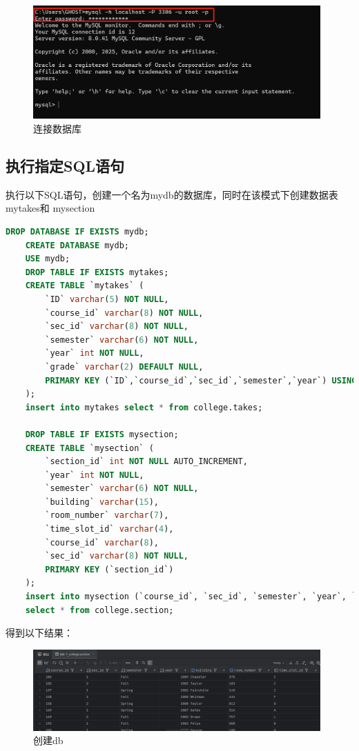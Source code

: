 \documentclass{article}
\begin{document}
	\begin{figure}[H]
		\centering
		\includegraphics[width=11cm]{./images/1.连接数据库.png}
		\caption{连接数据库}
	\end{figure}
	
	\subsection{执行指定SQL语句}
	
	执行以下SQL语句，创建一个名为mydb的数据库，同时在该模式下创建数据表mytakes和
	mysection
	
	\begin{lstlisting}[language=sql, title=创建db数据库, tabsize=4]
	DROP DATABASE IF EXISTS mydb;
	CREATE DATABASE mydb;
	USE mydb;
	DROP TABLE IF EXISTS mytakes;
	CREATE TABLE `mytakes` (
		`ID` varchar(5) NOT NULL,
		`course_id` varchar(8) NOT NULL,
		`sec_id` varchar(8) NOT NULL,
		`semester` varchar(6) NOT NULL,
		`year` int NOT NULL,
		`grade` varchar(2) DEFAULT NULL,
		PRIMARY KEY (`ID`,`course_id`,`sec_id`,`semester`,`year`) USING BTREE
	);
	insert into mytakes select * from college.takes;
	
	DROP TABLE IF EXISTS mysection;
	CREATE TABLE `mysection` (
		`section_id` int NOT NULL AUTO_INCREMENT,
		`year` int NOT NULL,
		`semester` varchar(6) NOT NULL,
		`building` varchar(15),
		`room_number` varchar(7),
		`time_slot_id` varchar(4),
		`course_id` varchar(8),
		`sec_id` varchar(8) NOT NULL,
		PRIMARY KEY (`section_id`)
	);
	insert into mysection (`course_id`, `sec_id`, `semester`, `year`, `building`, `room_number`, `time_slot_id`)
	select * from college.section;
	\end{lstlisting}
	
	得到以下结果：
	
	\begin{figure}[H]
		\centering
		\includegraphics[width=11cm]{./images/2.创建db.png}
		\caption{创建db}
	\end{figure}
	
\end{document}
